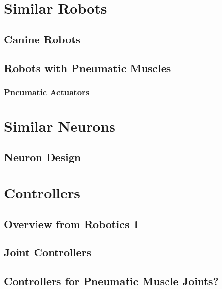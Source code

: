 \section{Similar Robots}

\subsection{Canine Robots}

\subsection{Robots with Pneumatic Muscles}

\subsubsection{Pneumatic Actuators}


\section{Similar Neurons}

\subsection{Neuron Design}

\section{Controllers}

\subsection{Overview from Robotics 1}

\subsection{Joint Controllers}

\subsection{Controllers for Pneumatic Muscle Joints?}

